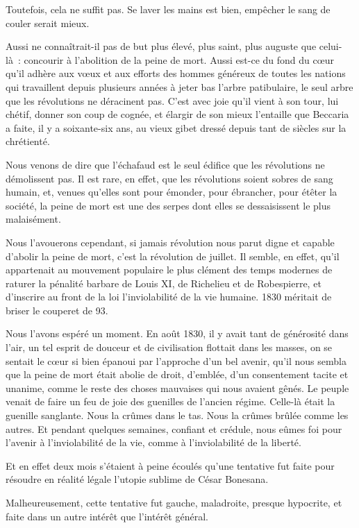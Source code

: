 \documentclass[french,twoside]{book} %
\begin{document}
Toutefois, cela ne suffit pas. Se laver les mains est bien, empêcher le sang de couler serait mieux.\par
Aussi ne connaîtrait-il pas de but plus élevé, plus saint, plus auguste que celui-là : concourir à l’abolition de la peine de mort. Aussi est-ce du fond du cœur qu’il adhère aux vœux et aux efforts des hommes généreux de toutes les nations qui travaillent depuis plusieurs années à jeter bas l’arbre patibulaire, le seul arbre que les révolutions ne déracinent pas. C’est avec joie qu’il vient à son tour, lui chétif, donner son coup de cognée, et élargir de son mieux l’entaille que Beccaria a faite, il y a soixante-six ans, au vieux gibet dressé depuis tant de siècles sur la chrétienté.\par
Nous venons de dire que l’échafaud est le seul édifice que les révolutions ne démolissent pas. Il est rare, en effet, que les révolutions soient sobres de sang humain, et, venues qu’elles sont pour émonder, pour ébrancher, pour étêter la société, la peine de mort est une des serpes dont elles se dessaisissent le plus malaisément.\par
Nous l’avouerons cependant, si jamais révolution nous parut digne et capable d’abolir la peine de mort, c’est la révolution de juillet. Il semble, en effet, qu’il appartenait au mouvement populaire le plus clément des temps modernes de raturer la pénalité barbare de Louis XI, de Richelieu et de Robespierre, et d’inscrire au front de la loi l’inviolabilité de la vie humaine. 1830 méritait de briser le couperet de 93.\par
Nous l’avons espéré un moment. En août 1830, il y avait tant de générosité dans l’air, un tel esprit de douceur et de  civilisation flottait dans les masses, on se sentait le cœur si bien épanoui par l’approche d’un bel avenir, qu’il nous sembla que la peine de mort était abolie de droit, d’emblée, d’un consentement tacite et unanime, comme le reste des choses mauvaises qui nous avaient gênés. Le peuple venait de faire un feu de joie des guenilles de l’ancien régime. Celle-là était la guenille sanglante. Nous la crûmes dans le tas. Nous la crûmes brûlée comme les autres. Et pendant quelques semaines, confiant et crédule, nous eûmes foi pour l’avenir à l’inviolabilité de la vie, comme à l’inviolabilité de la liberté.\par
Et en effet deux mois s’étaient à peine écoulés qu’une tentative fut faite pour résoudre en réalité légale l’utopie sublime de César Bonesana.\par
Malheureusement, cette tentative fut gauche, maladroite, presque hypocrite, et faite dans un autre intérêt que l’intérêt général.\par
\end{document}
